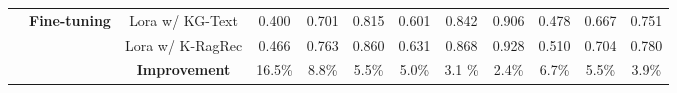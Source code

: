 \begin{table}[t]
{\begin{adjustbox}{}
\begin{tabular}{c|c|c|c|c|c|c|c|c|c|c|c}
    \cmidrule{2-12}
    &\multirow{3}{*}{\textbf{Fine-tuning}} &Lora w/ KG-Text&   0.400	&0.701	&0.815  &\colorbox{backblue!75}{0.601}  &\colorbox{backblue!75}{0.842} & \colorbox{backblue!75}{0.906}  &0.478   &0.667   &0.751 \\
     & & Lora w/ K-RagRec &   \colorbox{backred!50} {0.466}	& \colorbox{backred!50} {0.763}	&\colorbox{backred!50} {0.860}  & \colorbox{backred!50} {0.631}  & \colorbox{backred!50} {0.868}  & \colorbox{backred!50} {0.928}   & \colorbox{backred!50} {0.510}  & \colorbox{backred!50} {0.704}  & \colorbox{backred!50} {0.780} \\
    \cmidrule{3-12}
    && \cellcolor{verylightgray} \textbf{Improvement} &   \cellcolor{verylightgray}16.5\%  & \cellcolor{verylightgray}8.8\% & \cellcolor{verylightgray}5.5\%  & \cellcolor{verylightgray}5.0\% & \cellcolor{verylightgray}3.1 \% &  \cellcolor{verylightgray}2.4\%  &  \cellcolor{verylightgray}6.7\%  & \cellcolor{verylightgray}5.5\%   &   \cellcolor{verylightgray}3.9\%      \\
    \bottomrule
    \bottomrule
    \end{tabular}%
    \end{adjustbox}
}
  \label{tab:results}%
\end{table}%
